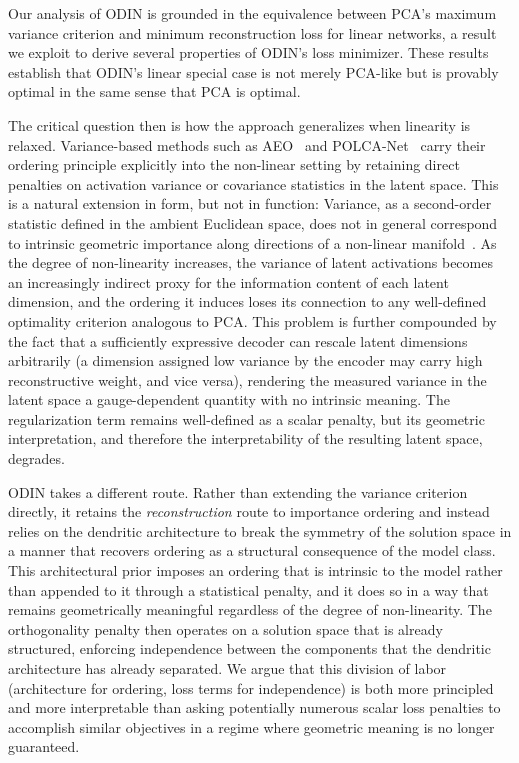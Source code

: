 \documentclass[twoside,11pt]{article}
\begin{document}
Our analysis of ODIN is grounded in the equivalence between PCA's maximum variance criterion and minimum reconstruction loss for linear networks, a result we exploit to derive several properties of ODIN's loss minimizer. These results establish that ODIN's linear special case is not merely PCA-like but is provably optimal in the same sense that PCA is optimal.

The critical question then is how the approach generalizes when linearity is relaxed. Variance-based methods such as AEO~\cite{augustine2024autoencoder} and POLCA-Net~\cite{perozo2024principal} carry their ordering principle explicitly into the non-linear setting by retaining direct penalties on activation variance or covariance statistics in the latent space. This is a natural extension in form, but not in function: Variance, as a second-order statistic defined in the ambient Euclidean space, does not in general correspond to intrinsic geometric importance along directions of a non-linear manifold~\cite{abuqrais2026riemannian}. As the degree of non-linearity increases, the variance of latent activations becomes an increasingly indirect proxy for the information content of each latent dimension, and the ordering it induces loses its connection to any well-defined optimality criterion analogous to PCA. This problem is further compounded by the fact that a sufficiently expressive decoder can rescale latent dimensions arbitrarily (a dimension assigned low variance by the encoder may carry high reconstructive weight, and vice versa), rendering the measured variance in the latent space a gauge-dependent quantity with no intrinsic meaning. The regularization term remains well-defined as a scalar penalty, but its geometric interpretation, and therefore the interpretability of the resulting latent space, degrades.

ODIN takes a different route. Rather than extending the variance criterion directly, it retains the \emph{reconstruction} route to importance ordering and instead relies on the dendritic architecture to break the symmetry of the solution space in a manner that recovers ordering as a structural consequence of the model class. This architectural prior imposes an ordering that is intrinsic to the model rather than appended to it through a statistical penalty, and it does so in a way that remains geometrically meaningful regardless of the degree of non-linearity. The orthogonality penalty then operates on a solution space that is already structured, enforcing independence between the components that the dendritic architecture has already separated. We argue that this division of labor (architecture for ordering, loss terms for independence) is both more principled and more interpretable than asking potentially numerous scalar loss penalties to accomplish similar objectives in a regime where geometric meaning is no longer guaranteed.
\end{document}
